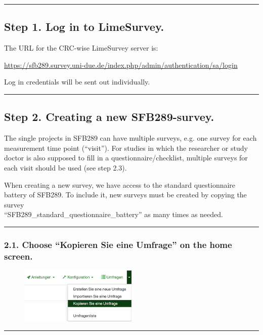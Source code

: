 \par\noindent\rule{\textwidth\color{pniblue}}{0.4pt}
\subsection*{Step 1. Log in to LimeSurvey.}
The URL for the CRC-wise LimeSurvey server is:

\hyperref[https://sfb289.survey.uni-due.de/index.php/admin/authentication/sa/login]{https://sfb289.survey.uni-due.de/index.php/admin/authentication/sa/login}

Log in credentials will be sent out individually. 

\par\noindent\rule{\textwidth\color{pniblue}}{0.4pt}
\subsection*{ Step 2. Creating a new SFB289-survey.}
The single projects in SFB289 can have multiple surveys, e.g. one survey for each measurement time point (“visit”). For studies in which the researcher or study doctor is also supposed to fill in a questionnaire/checklist, multiple surveys for each visit should be used (see step 2.3).

When creating a new survey, we have access to the standard questionnaire battery of SFB289. To include it, new surveys must be created by copying the survey \\ “SFB289\_standard\_questionnaire\_battery” as many times as needed. 

\par\noindent\rule{\textwidth\color{pniblue}}{0.4pt}
\subsubsection*{2.1. Choose “Kopieren Sie eine Umfrage” on the home screen.}
\begin{figure}[H]
\includegraphics[width=0.5\textwidth]{docs/fig/ls_sop2.1.png}
\end{figure}

\par\noindent\rule{\textwidth\color{pniblue}}{0.4pt}
